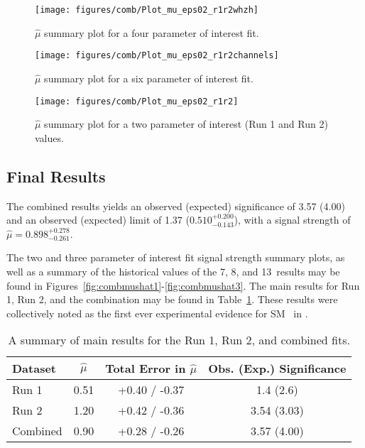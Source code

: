 \begin{figure}[!htbp]\captionsetup{justification=centering}
  \begin{center}
  \texttt{[image: figures/comb/Plot\_mu\_eps02\_r1r2whzh]}
  \caption{$\hat{\mu}$ summary plot for a four parameter of interest fit.}
  \label{fig:combmushat4}
  \end{center}
\end{figure}

\begin{figure}[!htbp]\captionsetup{justification=centering}
  \begin{center}
  \texttt{[image: figures/comb/Plot\_mu\_eps02\_r1r2channels]}
  \caption{$\hat{\mu}$ summary plot for a six parameter of interest fit.}
  \label{fig:combmushat5}
  \end{center}
\end{figure}

\begin{figure}[!htbp]\captionsetup{justification=centering}
  \begin{center}
  \texttt{[image: figures/comb/Plot\_mu\_eps02\_r1r2]}
  \caption{$\hat{\mu}$ summary plot for a two parameter of interest (Run 1 and Run 2) values.}
  \label{fig:combmushat6}
  \end{center}
\end{figure}

\subsection{Final Results}
The combined results yields an observed (expected) significance of 3.57 (4.00) and an observed (expected) limit of 1.37 ($0.510^{+0.200}_{-0.143}$), with a signal strength of $\hat{\mu}=0.898^{+0.278}_{-0.261}$.

The two and three parameter of interest fit signal strength summary plots, as well as a summary of the historical values of the 7, 8, and 13 \TeV\,results may be found in Figures~\ref{fig:combmushat1}-\ref{fig:combmushat3}.  The main results for Run 1, Run 2, and the combination may be found in Table~\ref{tableCombresykts}.  These results were collectively noted as the first ever experimental evidence for SM \vhbb\, in \cite{paper}.

\begin{table}[!htbp]\captionsetup{justification=centering}
\begin{center}
\begin{tabular}{lccc} \hline\hline
Dataset & $\hat{\mu}$ & Total Error in $\hat{\mu}$ & Obs. (Exp.) Significance \\
\hline
Run 1 & 0.51 & +0.40 / -0.37 & 1.4 (2.6)\\
Run 2 & 1.20 & +0.42 / -0.36 & 3.54 (3.03)\\
Combined & 0.90 & +0.28 / -0.26 & 3.57 (4.00)\\
\hline\hline
\end{tabular}
\caption{A summary of main results for the Run 1, Run 2, and combined fits.}
\label{tableCombresykts}
\end{center}
\end{table}


